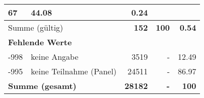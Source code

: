 \begin{longtable}{lXrrr}
       \num{67} &
       \num[round-mode=places,round-precision=2]{44.08} &
         \num[round-mode=places,round-precision=2]{0.24} \\
     \midrule
     \multicolumn{2}{l}{Summe (gültig)} &
       \textbf{\num{152}} &
     \textbf{100} &
       \textbf{\num[round-mode=places,round-precision=2]{0.54}} \\
     \multicolumn{5}{l}{\textbf{Fehlende Werte}}\\
       -998 &
       keine Angabe &
         \num{3519} &
        - &
         \num[round-mode=places,round-precision=2]{12.49} \\
       -995 &
       keine Teilnahme (Panel) &
         \num{24511} &
        - &
         \num[round-mode=places,round-precision=2]{86.97} \\
     \midrule
     \multicolumn{2}{l}{\textbf{Summe (gesamt)}} &
          \textbf{\num{28182}} &
        \textbf{-} &
        \textbf{100} \\
     \bottomrule
     \end{longtable}
     
